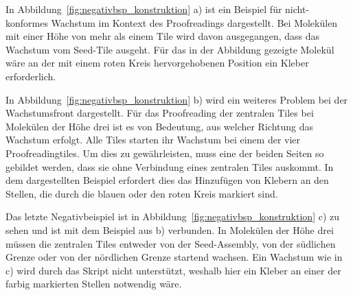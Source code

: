 In Abbildung~\ref{fig:negativbsp_konstruktion} a) ist ein Beispiel für nicht-konformes Wachstum im Kontext des Proofreadings dargestellt. Bei Molekülen mit einer Höhe von mehr als einem Tile wird davon ausgegangen, dass das Wachstum vom Seed-Tile ausgeht. Für das in der Abbildung gezeigte Molekül wäre an der mit einem roten Kreis hervorgehobenen Position ein Kleber erforderlich.

In Abbildung~\ref{fig:negativbsp_konstruktion} b) wird ein weiteres Problem bei der Wachstumsfront dargestellt.
Für das Proofreading der zentralen Tiles bei Molekülen der Höhe drei ist es von Bedeutung, aus welcher Richtung das Wachstum erfolgt. Alle Tiles starten ihr Wachstum bei einem der vier Proofreadingtiles.
Um dies zu gewährleisten, muss eine der beiden Seiten so gebildet werden, dass sie ohne Verbindung eines zentralen Tiles auskommt. In dem dargestellten Beispiel erfordert dies das Hinzufügen von Klebern an den Stellen, die durch die blauen oder den roten Kreis markiert sind.

Das letzte Negativbeispiel ist in Abbildung~\ref{fig:negativbsp_konstruktion} c) zu sehen und ist mit dem Beispiel aus b) verbunden. In Molekülen der Höhe drei müssen die zentralen Tiles entweder von der Seed-Assembly, von der südlichen Grenze oder von der nördlichen Grenze startend wachsen. Ein Wachstum wie in c) wird durch das Skript nicht unterstützt, weshalb hier ein Kleber an einer der farbig markierten Stellen notwendig wäre.

